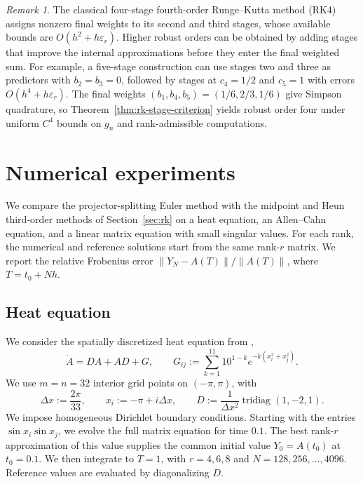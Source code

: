 \documentclass[]{article}
\numberwithin{equation}{section}
\theoremstyle{plain}
\theoremstyle{remark}
\newtheorem{remark}[theorem]{Remark}
\numberwithin{algorithm}{section}
\newcommand{\eps}{\varepsilon}
\begin{document}
\begin{remark}
\label{rem:higher-orders}
The classical four-stage fourth-order Runge--Kutta method (RK4) assigns
nonzero final weights to its second and third
stages, whose available bounds are \(O(h^2+h\eps_r)\).  Higher robust
orders can be obtained by adding stages that improve the internal
approximations before they enter the final weighted sum.  For example,
a five-stage construction can use stages two and three as predictors
with \(b_2=b_3=0\), followed by stages at \(c_4=1/2\) and \(c_5=1\)
with errors \(O(h^4+h\eps_r)\).  The final weights
\((b_1,b_4,b_5)=(1/6,2/3,1/6)\) give Simpson quadrature, so
Theorem~\ref{thm:rk-stage-criterion} yields robust order four under uniform
\(C^4\) bounds on \(g_n\) and rank-admissible computations.
\end{remark}

\section{Numerical experiments}
\label{sec:numerical}

We compare the projector-splitting Euler method with the midpoint and
Heun third-order methods of Section~\ref{sec:rk} on a heat equation,
an Allen--Cahn equation, and a linear matrix equation with small singular
values.  For each rank, the numerical and reference solutions start from
the same rank-\(r\) matrix.  We report the relative Frobenius error
\(\|Y_N-A(T)\|/\|A(T)\|\), where \(T=t_0+Nh\).

\subsection{Heat equation}
\label{sec:numerical-heat}

We consider the spatially discretized heat equation from
\cite{CerutiEinkemmerKuschLubich2024},
\begin{equation}\label{eq:numerical-heat}
 \dot A=DA+AD+G,
 \qquad
 G_{ij}:=\sum_{k=1}^{11}10^{1-k}e^{-k(x_i^2+x_j^2)}.
\end{equation}
We use \(m=n=32\) interior grid points on \((-\pi,\pi)\), with
\begin{equation}\label{eq:numerical-heat-grid}
 \Delta x:=\frac{2\pi}{33},\qquad
 x_i:=-\pi+i\Delta x,\qquad
 D:=\frac{1}{\Delta x^2}\operatorname{tridiag}(1,-2,1).
\end{equation}
We impose homogeneous Dirichlet boundary conditions.  Starting with the
entries \(\sin x_i\sin x_j\), we evolve the full matrix equation for
time \(0.1\).  The best rank-\(r\) approximation of this value supplies
the common initial value \(Y_0=A(t_0)\) at \(t_0=0.1\).
We then integrate to \(T=1\), with \(r=4,6,8\) and
\(N=128,256,\ldots,4096\).  Reference values are evaluated by
diagonalizing \(D\).
\end{document}
